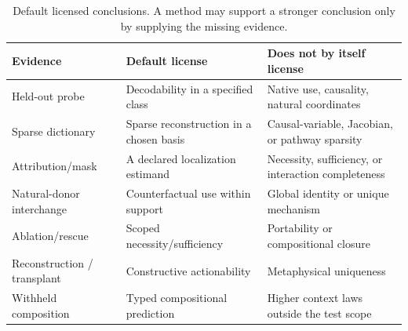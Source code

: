 \begin{table}[t]
\centering
\small
\caption{Default licensed conclusions. A method may support a stronger
conclusion only by supplying the missing evidence.}
\label{tab:licenses}
\begin{tabularx}{\textwidth}{P{0.20\textwidth}P{0.33\textwidth}Y}
\toprule
Evidence & Default license & Does not by itself license\\
\midrule
Held-out probe & Decodability in a specified class & Native use, causality, natural coordinates\\
Sparse dictionary & Sparse reconstruction in a chosen basis & Causal-variable, Jacobian, or pathway sparsity\\
Attribution/mask & A declared localization estimand & Necessity, sufficiency, or interaction completeness\\
Natural-donor interchange & Counterfactual use within support & Global identity or unique mechanism\\
Ablation/rescue & Scoped necessity/sufficiency & Portability or compositional closure\\
Reconstruction / transplant & Constructive actionability & Metaphysical uniqueness\\
Withheld composition & Typed compositional prediction & Higher context laws outside the test scope\\
\bottomrule
\end{tabularx}
\end{table}

